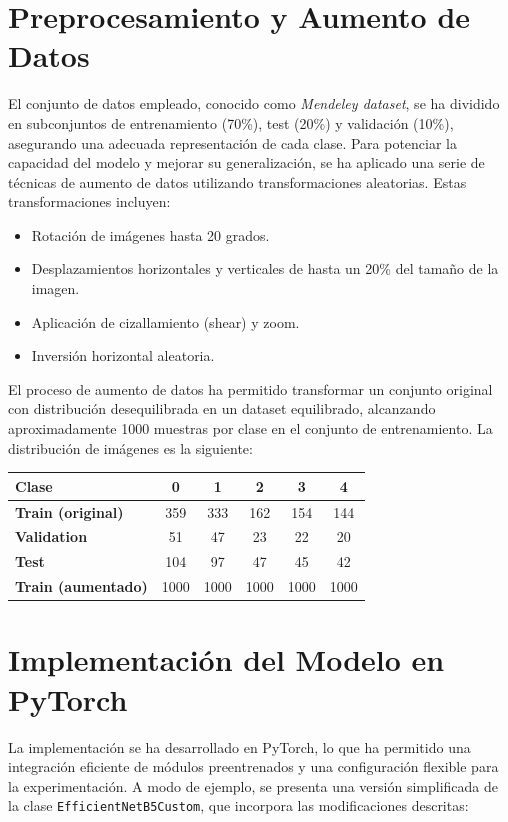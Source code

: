 \documentclass[11pt,spanish,listoffigures,listoftables]{tfgetsinf}
\begin{document}
\section{Preprocesamiento y Aumento de Datos}
El conjunto de datos empleado, conocido como \textit{Mendeley dataset}\cite{gornale2020digital}, se ha dividido en subconjuntos de entrenamiento (70\%), test (20\%) y validación (10\%), asegurando una adecuada representación de cada clase. Para potenciar la capacidad del modelo y mejorar su generalización, se ha aplicado una serie de técnicas de aumento de datos utilizando transformaciones aleatorias. Estas transformaciones incluyen:
\begin{itemize}
    \item Rotación de imágenes hasta 20 grados.
    \item Desplazamientos horizontales y verticales de hasta un 20\% del tamaño de la imagen.
    \item Aplicación de cizallamiento (shear) y zoom.
    \item Inversión horizontal aleatoria.
\end{itemize}

El proceso de aumento de datos ha permitido transformar un conjunto original con distribución desequilibrada en un dataset equilibrado, alcanzando aproximadamente 1000 muestras por clase en el conjunto de entrenamiento. La distribución de imágenes es la siguiente:

\begin{center}
\begin{tabular}{lccccc}
\textbf{Clase} & 0 & 1 & 2 & 3 & 4 \\
\hline
\textbf{Train (original)} & 359 & 333 & 162 & 154 & 144 \\
\textbf{Validation} & 51 & 47 & 23 & 22 & 20 \\
\textbf{Test} & 104 & 97 & 47 & 45 & 42 \\
\hline
\textbf{Train (aumentado)} & 1000 & 1000 & 1000 & 1000 & 1000 \\
\end{tabular}
\end{center}

\section{Implementación del Modelo en PyTorch}
La implementación se ha desarrollado en PyTorch, lo que ha permitido una integración eficiente de módulos preentrenados y una configuración flexible para la experimentación. A modo de ejemplo, se presenta una versión simplificada de la clase \texttt{EfficientNetB5Custom}, que incorpora las modificaciones descritas:
\end{document}
